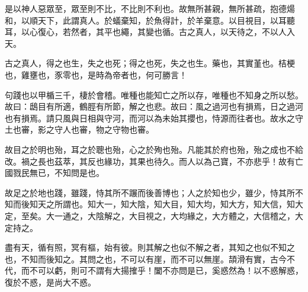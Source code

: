 \begin{pinyinscope}
是以神人惡眾至，眾至則不比，不比則不利也。故無所甚親，無所甚疏，抱德煬和，以順天下，此謂真人。於蟻棄知，於魚得計，於羊棄意。以目視目，以耳聽耳，以心復心，若然者，其平也繩，其變也循。古之真人，以天待之，不以人入天。

古之真人，得之也生，失之也死；得之也死，失之也生。藥也，其實堇也。桔梗也，雞壅也，豕零也，是時為帝者也，何可勝言！

句踐也以甲楯三千，棲於會稽。唯種也能知亡之所以存，唯種也不知身之所以愁。故曰：鴟目有所適，鶴脛有所節，解之也悲。故曰：風之過河也有損焉，日之過河也有損焉。請只風與日相與守河，而河以為未始其攖也，恃源而往者也。故水之守土也審，影之守人也審，物之守物也審。

故目之於明也殆，耳之於聰也殆，心之於殉也殆。凡能其於府也殆，殆之成也不給改。禍之長也茲萃，其反也緣功，其果也待久。而人以為己寶，不亦悲乎！故有亡國戮民無已，不知問是也。

故足之於地也踐，雖踐，恃其所不蹍而後善博也；人之於知也少，雖少，恃其所不知而後知天之所謂也。知大一，知大陰，知大目，知大均，知大方，知大信，知大定，至矣。大一通之，大陰解之，大目視之，大均緣之，大方體之，大信稽之，大定持之。

盡有天，循有照，冥有樞，始有彼。則其解之也似不解之者，其知之也似不知之也，不知而後知之。其問之也，不可以有崖，而不可以無崖。頡滑有實，古今不代，而不可以虧，則可不謂有大揚搉乎！闔不亦問是已，奚惑然為！以不惑解惑，復於不惑，是尚大不惑。


\end{pinyinscope}